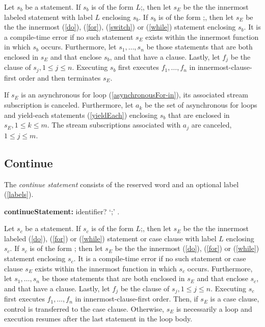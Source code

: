 \documentclass{article}
\newcommand{\code}[1]{{\sf #1}}
\begin{document}
\LMHash{}
Let $s_b$ be a \BREAK{} statement. If $s_b$ is of the form  \code{\BREAK{} $L$;}, then let $s_E$ be the the innermost labeled statement with label $L$ enclosing $s_b$. If $s_b$ is of the form \code{\BREAK{};},  then let $s_E$ be the the innermost  \DO{} (\ref{do}), \FOR{} (\ref{for}), \SWITCH{} (\ref{switch}) or \WHILE{} (\ref{while}) statement enclosing  $s_b$. It is a compile-time error if no such statement $s_E$ exists within the innermost function in which  $s_b$ occurs.  Furthermore, let $s_1, \ldots, s_n$ be those \TRY{} statements that are both enclosed in $s_E$ and that enclose  $s_b$, and that have a \FINALLY{} clause. Lastly, let $f_j$ be the \FINALLY{} clause of $s_j, 1 \le j \le n$.   Executing  $s_b$ first executes $f_1, \ldots,  f_n$ in innermost-clause-first  order and then terminates $s_E$. 

\LMHash{}
If $s_E$ is an asynchronous for loop (\ref{asynchronousFor-in}), its associated stream subscription is canceled. Furthermore, let $a_k$ be the set of asynchronous for loops  and yield-each statements (\ref{yieldEach}) enclosing $s_b$ that are enclosed in $s_E , 1 \le k \le m$.   The stream subscriptions associated with $a_j$ are canceled, $1 \le j \le m$. 



\subsection{ Continue}

\LMHash{}
The {\em continue statement} consists of the reserved word \CONTINUE{} and an optional label (\ref{labels}). 

\begin{grammar}
{\bf continueStatement:}
    \CONTINUE{} identifier? `{\escapegrammar ;}'
        .
 \end{grammar}      
 
\LMHash{}
 Let $s_c$ be a \CONTINUE{} statement. If $s_c$ is of the form  \code{\CONTINUE{} $L$;}, then let $s_E$ be the the innermost labeled \DO{} (\ref{do}), \FOR{} (\ref{for}) or \WHILE{} (\ref{while}) statement or case clause with label $L$ enclosing $s_c$. If $s_c$ is of the form \code{\CONTINUE{};}  then let $s_E$ be the the innermost  \DO{} (\ref{do}), \FOR{} (\ref{for}) or \WHILE{} (\ref{while}) statement enclosing  $s_c$. It is a compile-time error if no such statement or case clause $s_E$ exists within the innermost function in which  $s_c$ occurs.  Furthermore, let $s_1, \ldots, s_n$ be those \TRY{} statements that are both enclosed in $s_E$ and that enclose  $s_c$, and that have a \FINALLY{} clause. Lastly, let $f_j$ be the \FINALLY{} clause of $s_j, 1 \le j \le n$.   Executing  $s_c$ first executes $f_1, \ldots,  f_n$ in innermost-clause-first  order. Then, if $s_E$ is a case clause, control is transferred to the case clause. Otherwise, $s_E$ is necessarily a loop and execution resumes after the last statement in the loop body.
 
\end{document}
